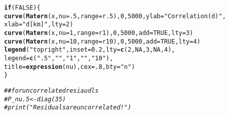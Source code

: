 \documentclass{article}\usepackage[]{graphicx}\usepackage[]{color}
\makeatletter
\newcommand{\hlnum}[1]{\textcolor[rgb]{0.686,0.059,0.569}{#1}}%
\newcommand{\hlstr}[1]{\textcolor[rgb]{0.192,0.494,0.8}{#1}}%
\newcommand{\hlcom}[1]{\textcolor[rgb]{0.678,0.584,0.686}{\textit{#1}}}%
\newcommand{\hlstd}[1]{\textcolor[rgb]{0.345,0.345,0.345}{#1}}%
\newcommand{\hlkwa}[1]{\textcolor[rgb]{0.161,0.373,0.58}{\textbf{#1}}}%
\newcommand{\hlkwc}[1]{\textcolor[rgb]{0.333,0.667,0.333}{#1}}%
\newcommand{\hlkwd}[1]{\textcolor[rgb]{0.737,0.353,0.396}{\textbf{#1}}}%
\newenvironment{kframe}{%
 \def\at@end@of@kframe{}%
 \ifinner\ifhmode%
  \def\at@end@of@kframe{\end{minipage}}%
  \begin{minipage}{\columnwidth}%
 \fi\fi%
 \def\FrameCommand##1{\hskip\@totalleftmargin \hskip-\fboxsep
 \colorbox{shadecolor}{##1}\hskip-\fboxsep
     \hskip-\linewidth \hskip-\@totalleftmargin \hskip\columnwidth}%
 \MakeFramed {\advance\hsize-\width
   \@totalleftmargin\z@ \linewidth\hsize
   \@setminipage}}%
 {\par\unskip\endMakeFramed%
 \at@end@of@kframe}
\newenvironment{knitrout}{}{} %
\makeatother
\begin{document}
\begin{knitrout}
\begin{kframe}
\begin{alltt}
\hlkwa{if}\hlstd{(}\hlnum{FALSE}\hlstd{)\{}
  \hlkwd{curve}\hlstd{(}\hlkwd{Matern}\hlstd{(x,} \hlkwc{nu} \hlstd{=} \hlnum{.5}\hlstd{,} \hlkwc{range} \hlstd{= r.5),} \hlnum{0}\hlstd{,} \hlnum{5000}\hlstd{,} \hlkwc{ylab} \hlstd{=} \hlstr{"Correlation(d)"}\hlstd{,}
        \hlkwc{xlab} \hlstd{=} \hlstr{"d [km]"}\hlstd{,} \hlkwc{lty} \hlstd{=} \hlnum{2}\hlstd{)}
  \hlkwd{curve}\hlstd{(}\hlkwd{Matern}\hlstd{(x,} \hlkwc{nu} \hlstd{=} \hlnum{1}\hlstd{,} \hlkwc{range} \hlstd{= r1),} \hlnum{0}\hlstd{,} \hlnum{5000}\hlstd{,} \hlkwc{add} \hlstd{=} \hlnum{TRUE}\hlstd{,} \hlkwc{lty} \hlstd{=} \hlnum{3}\hlstd{)}
  \hlkwd{curve}\hlstd{(}\hlkwd{Matern}\hlstd{(x,} \hlkwc{nu} \hlstd{=} \hlnum{10}\hlstd{,} \hlkwc{range} \hlstd{= r10),} \hlnum{0}\hlstd{,} \hlnum{5000}\hlstd{,} \hlkwc{add} \hlstd{=} \hlnum{TRUE}\hlstd{,} \hlkwc{lty} \hlstd{=} \hlnum{4}\hlstd{)}
  \hlkwd{legend}\hlstd{(}\hlstr{"topright"}\hlstd{,} \hlkwc{inset} \hlstd{=} \hlnum{0.2}\hlstd{,} \hlkwc{lty} \hlstd{=} \hlkwd{c}\hlstd{(}\hlnum{2}\hlstd{,} \hlnum{NA}\hlstd{,} \hlnum{3}\hlstd{,} \hlnum{NA}\hlstd{,} \hlnum{4}\hlstd{),}
         \hlkwc{legend} \hlstd{=} \hlkwd{c}\hlstd{(}\hlstr{".5"}\hlstd{,} \hlstr{""}\hlstd{,} \hlstr{"1"}\hlstd{,} \hlstr{""}\hlstd{,} \hlstr{"10"}\hlstd{),}
       \hlkwc{title} \hlstd{=} \hlkwd{expression}\hlstd{(nu),} \hlkwc{cex} \hlstd{=} \hlnum{.8}\hlstd{,} \hlkwc{bty} \hlstd{=} \hlstr{"n"}\hlstd{)}
\hlstd{\}}


\hlcom{## for uncorrelated resiaudls}
\hlcom{#   P_nu.5 <- diag(35)}
\hlcom{#   print("Residuals are uncorrelated!")}
\end{alltt}
\end{kframe}
\end{knitrout}
\end{document}
